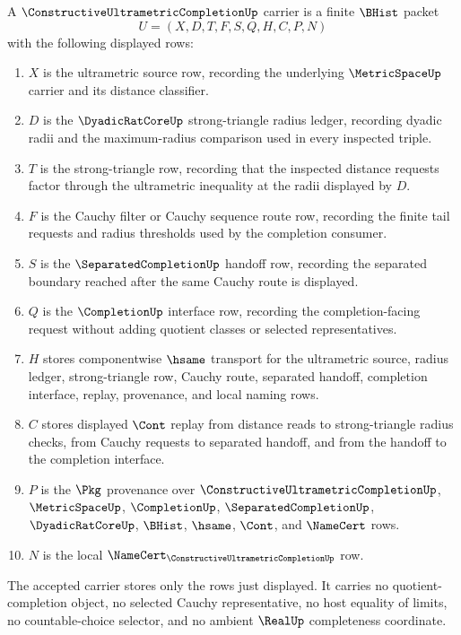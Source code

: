 \begin{definition}
\label{def:constructive-ultrametric-completion-carrier}
A $\ConstructiveUltrametricCompletionUp$ carrier is a finite $\BHist$ packet
$$
U=(X,D,T,F,S,Q,H,C,P,N)
$$
with the following displayed rows:
\begin{enumerate}
\item $X$ is the ultrametric source row, recording the underlying $\MetricSpaceUp$ carrier and its distance classifier.
\item $D$ is the $\DyadicRatCoreUp$ strong-triangle radius ledger, recording dyadic radii and the maximum-radius comparison used in every inspected triple.
\item $T$ is the strong-triangle row, recording that the inspected distance requests factor through the ultrametric inequality at the radii displayed by $D$.
\item $F$ is the Cauchy filter or Cauchy sequence route row, recording the finite tail requests and radius thresholds used by the completion consumer.
\item $S$ is the $\SeparatedCompletionUp$ handoff row, recording the separated boundary reached after the same Cauchy route is displayed.
\item $Q$ is the $\CompletionUp$ interface row, recording the completion-facing request without adding quotient classes or selected representatives.
\item $H$ stores componentwise $\hsame$ transport for the ultrametric source, radius ledger, strong-triangle row, Cauchy route, separated handoff, completion interface, replay, provenance, and local naming rows.
\item $C$ stores displayed $\Cont$ replay from distance reads to strong-triangle radius checks, from Cauchy requests to separated handoff, and from the handoff to the completion interface.
\item $P$ is the $\Pkg$ provenance over $\ConstructiveUltrametricCompletionUp$, $\MetricSpaceUp$, $\CompletionUp$, $\SeparatedCompletionUp$, $\DyadicRatCoreUp$, $\BHist$, $\hsame$, $\Cont$, and $\NameCert$ rows.
\item $N$ is the local $\NameCert_{\ConstructiveUltrametricCompletionUp}$ row.
\end{enumerate}
The accepted carrier stores only the rows just displayed. It carries no quotient-completion object, no selected Cauchy representative, no host equality of limits, no countable-choice selector, and no ambient $\RealUp$ completeness coordinate.
\end{definition}

